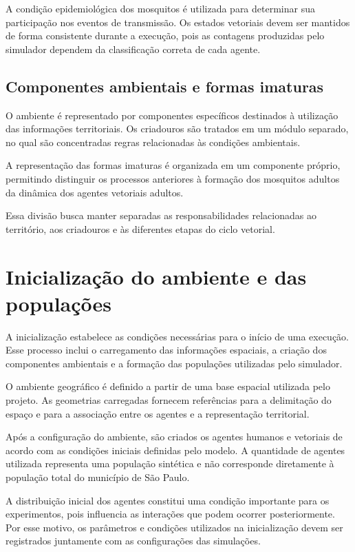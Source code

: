 A condição epidemiológica dos mosquitos é utilizada para determinar sua participação nos eventos de transmissão. Os estados vetoriais devem ser mantidos de forma consistente durante a execução, pois as contagens produzidas pelo simulador dependem da classificação correta de cada agente.

\subsection{Componentes ambientais e formas imaturas}

O ambiente é representado por componentes específicos destinados à utilização das informações territoriais. Os criadouros são tratados em um módulo separado, no qual são concentradas regras relacionadas às condições ambientais.

A representação das formas imaturas é organizada em um componente próprio, permitindo distinguir os processos anteriores à formação dos mosquitos adultos da dinâmica dos agentes vetoriais adultos.

Essa divisão busca manter separadas as responsabilidades relacionadas ao território, aos criadouros e às diferentes etapas do ciclo vetorial.

\section{Inicialização do ambiente e das populações}

A inicialização estabelece as condições necessárias para o início de uma execução. Esse processo inclui o carregamento das informações espaciais, a criação dos componentes ambientais e a formação das populações utilizadas pelo simulador.

O ambiente geográfico é definido a partir de uma base espacial utilizada pelo projeto. As geometrias carregadas fornecem referências para a delimitação do espaço e para a associação entre os agentes e a representação territorial.

Após a configuração do ambiente, são criados os agentes humanos e vetoriais de acordo com as condições iniciais definidas pelo modelo. A quantidade de agentes utilizada representa uma população sintética e não corresponde diretamente à população total do município de São Paulo.

A distribuição inicial dos agentes constitui uma condição importante para os experimentos, pois influencia as interações que podem ocorrer posteriormente. Por esse motivo, os parâmetros e condições utilizados na inicialização devem ser registrados juntamente com as configurações das simulações.

